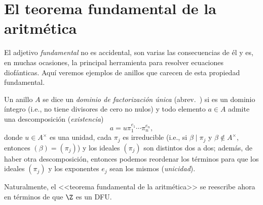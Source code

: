\documentclass[11pt, reqno]{amsart}
\begin{document}
\begin{enumerate}


\end{enumerate}

\section{El teorema fundamental de la aritmética}
El adjetivo \emph{fundamental} no es accidental, son varias las consecuencias de él y es, en muchas ocasiones, la principal herramienta para
resolver ecuaciones diofánticas.
Aquí veremos ejemplos de anillos que carecen de esta propiedad fundamental.
\begin{mydef}
	Un anillo $A$ se dice un \emph{dominio de factorización única} (abrev.\ ) si es un dominio íntegro (i.e., no tiene
	divisores de cero no nulos) y todo elemento $a \in A$ admite una descomposición (\emph{existencia})
	\[
		a = u \pi_1^{e_1} \cdots \pi_n^{e_n},
	\]
	donde $u \in A^\times$ es una unidad, cada $\pi_j$ es irreducible (i.e., si $\beta \mid \pi_j$ y $\beta \notin A^\times$, entonces
	$(\beta) = (\pi_j)$) y los ideales $(\pi_j)$ son distintos dos a dos;
	además, de haber otra descomposición, entonces podemos reordenar los términos para que los ideales $(\pi_j)$ y los exponentes $e_j$
	sean los mismos (\emph{unicidad}).
\end{mydef}
Naturalmente, el <<teorema fundamental de la aritmética>> se reescribe ahora en términos de que $\Z$ es un DFU.
\end{document}
